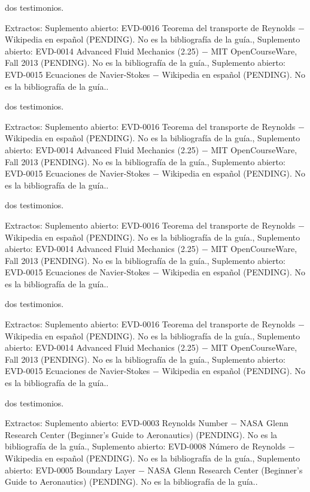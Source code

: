 \documentclass{book}
\begin{document}
\noindent dos testimonios.

\noindent Extractos: Suplemento abierto: EVD-0016 Teorema del transporte de Reynolds \(-\) Wikipedia en español (PENDING). No es la bibliografía de la guía., Suplemento abierto: EVD-0014 Advanced Fluid Mechanics (2.25) \(-\) MIT OpenCourseWare, Fall 2013 (PENDING). No es la bibliografía de la guía., Suplemento abierto: EVD-0015 Ecuaciones de Navier-Stokes \(-\) Wikipedia en español (PENDING). No es la bibliografía de la guía..

\noindent dos testimonios.

\noindent Extractos: Suplemento abierto: EVD-0016 Teorema del transporte de Reynolds \(-\) Wikipedia en español (PENDING). No es la bibliografía de la guía., Suplemento abierto: EVD-0014 Advanced Fluid Mechanics (2.25) \(-\) MIT OpenCourseWare, Fall 2013 (PENDING). No es la bibliografía de la guía., Suplemento abierto: EVD-0015 Ecuaciones de Navier-Stokes \(-\) Wikipedia en español (PENDING). No es la bibliografía de la guía..

\noindent dos testimonios.

\noindent Extractos: Suplemento abierto: EVD-0016 Teorema del transporte de Reynolds \(-\) Wikipedia en español (PENDING). No es la bibliografía de la guía., Suplemento abierto: EVD-0014 Advanced Fluid Mechanics (2.25) \(-\) MIT OpenCourseWare, Fall 2013 (PENDING). No es la bibliografía de la guía., Suplemento abierto: EVD-0015 Ecuaciones de Navier-Stokes \(-\) Wikipedia en español (PENDING). No es la bibliografía de la guía..

\noindent dos testimonios.

\noindent Extractos: Suplemento abierto: EVD-0016 Teorema del transporte de Reynolds \(-\) Wikipedia en español (PENDING). No es la bibliografía de la guía., Suplemento abierto: EVD-0014 Advanced Fluid Mechanics (2.25) \(-\) MIT OpenCourseWare, Fall 2013 (PENDING). No es la bibliografía de la guía., Suplemento abierto: EVD-0015 Ecuaciones de Navier-Stokes \(-\) Wikipedia en español (PENDING). No es la bibliografía de la guía..

\noindent dos testimonios.

\noindent Extractos: Suplemento abierto: EVD-0003 Reynolds Number \(-\) NASA Glenn Research Center (Beginner's Guide to Aeronautics) (PENDING). No es la bibliografía de la guía., Suplemento abierto: EVD-0008 Número de Reynolds \(-\) Wikipedia en español (PENDING). No es la bibliografía de la guía., Suplemento abierto: EVD-0005 Boundary Layer \(-\) NASA Glenn Research Center (Beginner's Guide to Aeronautics) (PENDING). No es la bibliografía de la guía..
\end{document}
